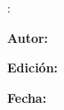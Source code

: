 \clearpage
\thispagestyle{empty}
\null
\vfill
\begin{minipage}{0.86\textwidth}
{\small
\textbf{\BookTitle}\par
\BookSubtitle\par
\BookVolume: \BookVolumeSubtitle\par
\vspace{0.65cm}
\textbf{Autor:} \BookAuthor\par
\textbf{Edición:} \BookEdition\par
\textbf{Fecha:} \BookDate\par
\vspace{0.65cm}
\BookLegalNotice\par
}
\end{minipage}
\vspace*{1.2cm}
